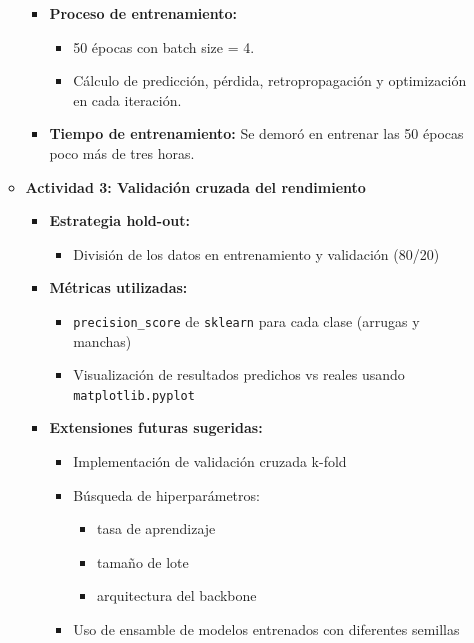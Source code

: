 \begin{enumerate}
\begin{itemize}
\begin{itemize}
      \item \textbf{Proceso de entrenamiento:}
      \begin{itemize}
        \item 50 épocas con batch size = 4.
        \item Cálculo de predicción, pérdida, retropropagación y optimización en cada iteración.
      \end{itemize}
    
      \item \textbf{Tiempo de entrenamiento:}
      Se demoró en entrenar las 50 épocas poco más de tres horas.
    \end{itemize}
  
    \item \textbf{Actividad 3: Validación cruzada del rendimiento}
    \begin{itemize}
      \item \textbf{Estrategia hold-out:}
      \begin{itemize}
        \item División de los datos en entrenamiento y validación (80/20)
      \end{itemize}
  
      \item \textbf{Métricas utilizadas:}
      \begin{itemize}
        \item \texttt{precision\_score} de \texttt{sklearn} para cada clase (arrugas y manchas)
        \item Visualización de resultados predichos vs reales usando \texttt{matplotlib.pyplot}
      \end{itemize}
  
      \item \textbf{Extensiones futuras sugeridas:}
      \begin{itemize}
        \item Implementación de validación cruzada k-fold
        \item Búsqueda de hiperparámetros:
        \begin{itemize}
          \item tasa de aprendizaje
          \item tamaño de lote
          \item arquitectura del backbone
        \end{itemize}
        \item Uso de ensamble de modelos entrenados con diferentes semillas
      \end{itemize}
  
    \end{itemize}
  
  \end{itemize}

\end{enumerate}



